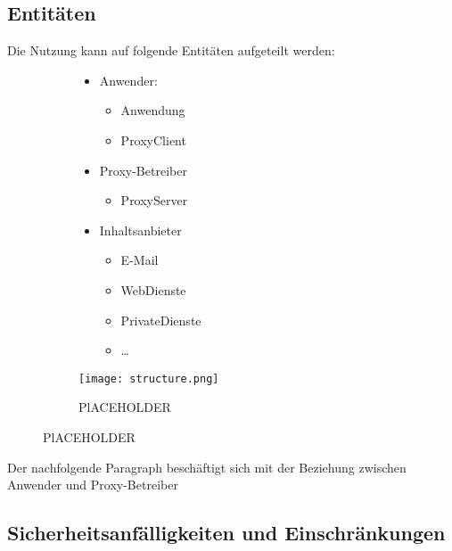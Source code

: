 \documentclass[12pt, a4paper]{scrartcl}
\begin{document}
\subsection{Entitäten}
Die Nutzung kann auf folgende Entitäten aufgeteilt werden:
\begin{figure}[H]
    \centering
    \begin{subfigure}{0.45\textwidth}
        \begin{itemize}
            \item Anwender:
            \begin{itemize}
                \item Anwendung
                \item ProxyClient
            \end{itemize}
            \item Proxy-Betreiber
            \begin{itemize}
                \item ProxyServer
            \end{itemize}
            \item Inhaltsanbieter
            \begin{itemize}
                \item E-Mail
                \item WebDienste
                \item PrivateDienste
                \item \ldots
            \end{itemize}
        \end{itemize}
    \end{subfigure}
    \begin{subfigure}{0.5\textwidth}
        \centering
        \texttt{[image: structure.png]}
        \caption{PlACEHOLDER}
        \label{fig::enti}
    \end{subfigure}
\end{figure}

Der nachfolgende Paragraph beschäftigt sich mit der Beziehung zwischen Anwender und Proxy-Betreiber
\subsection{Sicherheitsanfälligkeiten und Einschränkungen}
\end{document}
